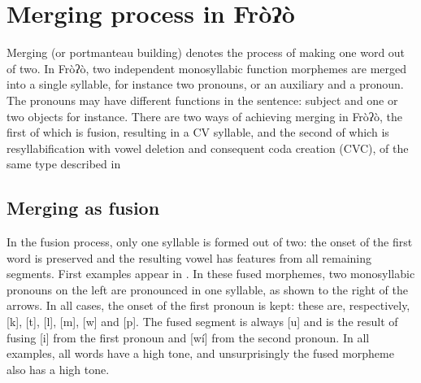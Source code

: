 \documentclass[output=paper]{langscibook}
\begin{document}
\section{Merging process in Fròʔò}\label{sec:traore:merging_process:4}

Merging (or portmanteau building) denotes the process of making one word out of two. In Fròʔò, two independent monosyllabic function morphemes are merged into a single syllable, for instance two pronouns, or an auxiliary and a pronoun. The pronouns may have different functions in the sentence: subject and one or two objects for instance. There are two ways of achieving merging in Fròʔò, the first of which is fusion, resulting in a CV syllable, and the second of which is resyllabification with vowel deletion and consequent coda creation (CVC), of the same type described in 

\subsection{Merging as fusion}
\label{sec:traore:merging_as_fusion:4a}

In the fusion process, only one syllable is formed out of two: the onset of the first word is preserved and the resulting vowel has features from all remaining segments. First examples appear in . In these fused morphemes, two monosyllabic pronouns on the left are pronounced in one syllable, as shown to the right of the arrows. In all cases, the onset of the first pronoun is kept: these are, respectively, [k], [t], [l], [m], [w] and [p]. The fused segment is always [u] and is the result of fusing [i] from the first pronoun and [wí] from the second pronoun. In all examples, all words have a high tone, and unsurprisingly the fused morpheme also has a high tone.
    
\end{document}
